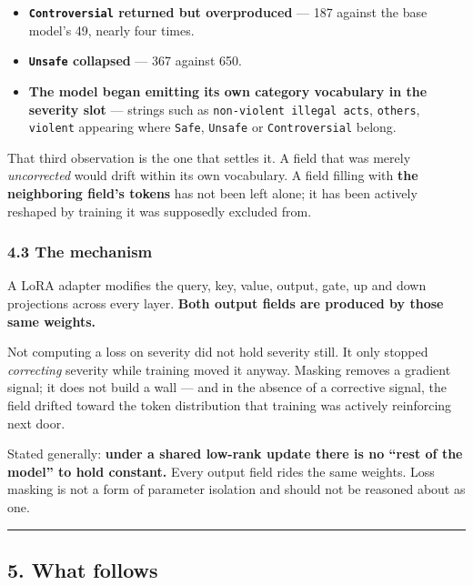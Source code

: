 \begin{itemize}
\tightlist
\item
  \textbf{\texttt{Controversial} returned but overproduced} --- 187 against the base model's 49, nearly four times.
\item
  \textbf{\texttt{Unsafe} collapsed} --- 367 against 650.
\item
  \textbf{The model began emitting its own category vocabulary in the severity slot} --- strings such as
  \texttt{non-violent\ illegal\ acts}, \texttt{others}, \texttt{violent} appearing where \texttt{Safe}, \texttt{Unsafe} or \texttt{Controversial}
  belong.
\end{itemize}

That third observation is the one that settles it. A field that was merely \emph{uncorrected} would drift
within its own vocabulary. A field filling with \textbf{the neighboring field's tokens} has not been left
alone; it has been actively reshaped by training it was supposedly excluded from.

\subsubsection{4.3 The mechanism}\label{the-mechanism}

A LoRA adapter modifies the query, key, value, output, gate, up and down projections across every
layer. \textbf{Both output fields are produced by those same weights.}

Not computing a loss on severity did not hold severity still. It only stopped \emph{correcting} severity
while training moved it anyway. Masking removes a gradient signal; it does not build a wall --- and in
the absence of a corrective signal, the field drifted toward the token distribution that training was
actively reinforcing next door.

Stated generally: \textbf{under a shared low-rank update there is no ``rest of the model'' to hold constant.}
Every output field rides the same weights. Loss masking is not a form of parameter isolation and
should not be reasoned about as one.

\begin{center}\rule{0.5\linewidth}{0.5pt}\end{center}

\subsection{5. What follows}\label{what-follows}


